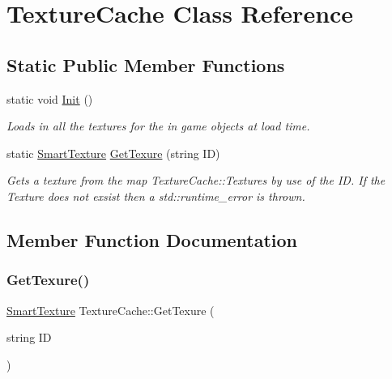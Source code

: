 \hypertarget{class_texture_cache}{}\section{Texture\+Cache Class Reference}
\label{class_texture_cache}
\subsection*{Static Public Member Functions}
\begin{DoxyCompactItemize}
\item 
static void \hyperlink{class_texture_cache_a60e9f696d701a6f62418ae8fc6c4b2c0}{Init} ()
\begin{DoxyCompactList}\small\item\em Loads in all the textures for the in game objects at load time. \end{DoxyCompactList}\item 
static \hyperlink{struct_smart_texture}{Smart\+Texture} \hyperlink{class_texture_cache_a2f8d74bc575243c5bf064aa7d7e35b8d}{Get\+Texure} (string ID)
\begin{DoxyCompactList}\small\item\em Gets a texture from the map Texture\+Cache\+::\+Textures by use of the ID. If the Texture does not exsist then a std\+::runtime\+\_\+error is thrown. \end{DoxyCompactList}\end{DoxyCompactItemize}


\subsection{Member Function Documentation}
\mbox{\label{class_texture_cache_a2f8d74bc575243c5bf064aa7d7e35b8d}} 
\subsubsection{\texorpdfstring{Get\+Texure()}{GetTexure()}}
{\footnotesize\ttfamily \hyperlink{struct_smart_texture}{Smart\+Texture} Texture\+Cache\+::\+Get\+Texure (\begin{DoxyParamCaption}\item[{string}]{ID }\end{DoxyParamCaption})\hspace{0.3cm}{\ttfamily [static]}}



